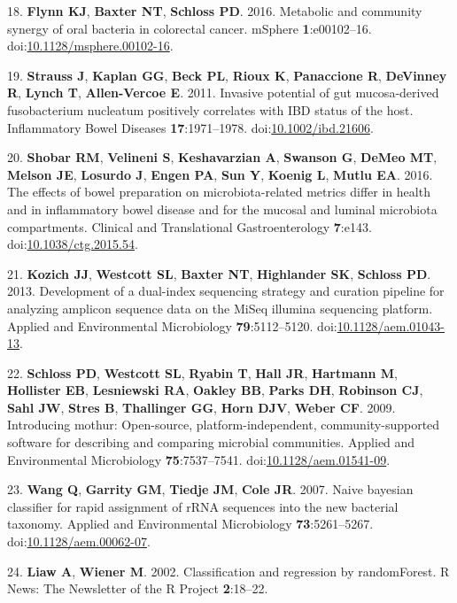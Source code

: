 \documentclass[11pt,]{article}
\begin{document}
\hypertarget{ref-Flynn2016}{}
18. \textbf{Flynn KJ}, \textbf{Baxter NT}, \textbf{Schloss PD}. 2016.
Metabolic and community synergy of oral bacteria in colorectal cancer.
mSphere \textbf{1}:e00102--16.
doi:\href{https://doi.org/10.1128/msphere.00102-16}{10.1128/msphere.00102-16}.

\hypertarget{ref-Strauss2011}{}
19. \textbf{Strauss J}, \textbf{Kaplan GG}, \textbf{Beck PL},
\textbf{Rioux K}, \textbf{Panaccione R}, \textbf{DeVinney R},
\textbf{Lynch T}, \textbf{Allen-Vercoe E}. 2011. Invasive potential of
gut mucosa-derived fusobacterium nucleatum positively correlates with
IBD status of the host. Inflammatory Bowel Diseases
\textbf{17}:1971--1978.
doi:\href{https://doi.org/10.1002/ibd.21606}{10.1002/ibd.21606}.

\hypertarget{ref-Shobar2016}{}
20. \textbf{Shobar RM}, \textbf{Velineni S}, \textbf{Keshavarzian A},
\textbf{Swanson G}, \textbf{DeMeo MT}, \textbf{Melson JE},
\textbf{Losurdo J}, \textbf{Engen PA}, \textbf{Sun Y}, \textbf{Koenig
L}, \textbf{Mutlu EA}. 2016. The effects of bowel preparation on
microbiota-related metrics differ in health and in inflammatory bowel
disease and for the mucosal and luminal microbiota compartments.
Clinical and Translational Gastroenterology \textbf{7}:e143.
doi:\href{https://doi.org/10.1038/ctg.2015.54}{10.1038/ctg.2015.54}.

\hypertarget{ref-Kozich2013}{}
21. \textbf{Kozich JJ}, \textbf{Westcott SL}, \textbf{Baxter NT},
\textbf{Highlander SK}, \textbf{Schloss PD}. 2013. Development of a
dual-index sequencing strategy and curation pipeline for analyzing
amplicon sequence data on the MiSeq illumina sequencing platform.
Applied and Environmental Microbiology \textbf{79}:5112--5120.
doi:\href{https://doi.org/10.1128/aem.01043-13}{10.1128/aem.01043-13}.

\hypertarget{ref-Schloss2009}{}
22. \textbf{Schloss PD}, \textbf{Westcott SL}, \textbf{Ryabin T},
\textbf{Hall JR}, \textbf{Hartmann M}, \textbf{Hollister EB},
\textbf{Lesniewski RA}, \textbf{Oakley BB}, \textbf{Parks DH},
\textbf{Robinson CJ}, \textbf{Sahl JW}, \textbf{Stres B},
\textbf{Thallinger GG}, \textbf{Horn DJV}, \textbf{Weber CF}. 2009.
Introducing mothur: Open-source, platform-independent,
community-supported software for describing and comparing microbial
communities. Applied and Environmental Microbiology
\textbf{75}:7537--7541.
doi:\href{https://doi.org/10.1128/aem.01541-09}{10.1128/aem.01541-09}.

\hypertarget{ref-Wang2007}{}
23. \textbf{Wang Q}, \textbf{Garrity GM}, \textbf{Tiedje JM},
\textbf{Cole JR}. 2007. Naive bayesian classifier for rapid assignment
of rRNA sequences into the new bacterial taxonomy. Applied and
Environmental Microbiology \textbf{73}:5261--5267.
doi:\href{https://doi.org/10.1128/aem.00062-07}{10.1128/aem.00062-07}.

\hypertarget{ref-Liaw2002}{}
24. \textbf{Liaw A}, \textbf{Wiener M}. 2002. Classification and
regression by randomForest. R News: The Newsletter of the R Project
\textbf{2}:18--22.
\end{document}
